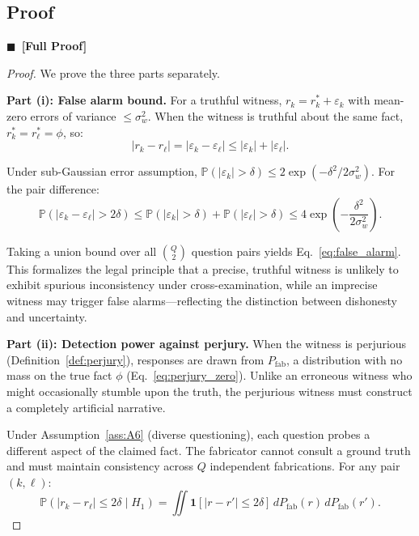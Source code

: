 \documentclass[11pt,a4paper]{article}
\theoremstyle{definition}
\newcommand{\rigorFull}[0]{$\blacksquare$~\textbf{[Full Proof]}}
\newcommand{\Pbb}{\mathbb{P}}
\newcommand{\ind}[1]{\mathbf{1}[#1]}
\newcommand{\abs}[1]{\left|#1\right|}
\newcommand{\fact}{\phi}                        %
\begin{document}
\subsection{Proof} \rigorFull

\begin{proof}
We prove the three parts separately.

\medskip\noindent\textbf{Part (i): False alarm bound.}
For a truthful witness, $r_k = r_k^* + \varepsilon_k$ with mean-zero errors of variance $\leq \sigma_w^2$. When the witness is truthful about the same fact, $r_k^* = r_\ell^* = \fact$, so:
\begin{equation}
    \abs{r_k - r_\ell} = \abs{\varepsilon_k - \varepsilon_\ell} \leq \abs{\varepsilon_k} + \abs{\varepsilon_\ell}.
\end{equation}

Under sub-Gaussian error assumption, $\Pbb(\abs{\varepsilon_k} > \delta) \leq 2\exp(-\delta^2 / 2\sigma_w^2)$. For the pair difference:
\begin{equation}
    \Pbb(\abs{\varepsilon_k - \varepsilon_\ell} > 2\delta) \leq \Pbb(\abs{\varepsilon_k} > \delta) + \Pbb(\abs{\varepsilon_\ell} > \delta) \leq 4\exp\left(-\frac{\delta^2}{2\sigma_w^2}\right).
\end{equation}

Taking a union bound over all $\binom{Q}{2}$ question pairs yields Eq.~\eqref{eq:false_alarm}. This formalizes the legal principle that a precise, truthful witness is unlikely to exhibit spurious inconsistency under cross-examination, while an imprecise witness may trigger false alarms---reflecting the distinction between dishonesty and uncertainty.

\medskip\noindent\textbf{Part (ii): Detection power against perjury.}
When the witness is perjurious (Definition~\ref{def:perjury}), responses are drawn from $P_{\mathrm{fab}}$, a distribution with no mass on the true fact $\fact$ (Eq.~\eqref{eq:perjury_zero}). Unlike an erroneous witness who might occasionally stumble upon the truth, the perjurious witness must construct a completely artificial narrative.

Under Assumption~\ref{ass:A6} (diverse questioning), each question probes a different aspect of the claimed fact. The fabricator cannot consult a ground truth and must maintain consistency across $Q$ independent fabrications. For any pair $(k, \ell)$:
\begin{equation}
    \Pbb(\abs{r_k - r_\ell} \leq 2\delta \mid H_1) = \iint \ind{\abs{r - r'} \leq 2\delta} \, dP_{\mathrm{fab}}(r) \, dP_{\mathrm{fab}}(r').
\end{equation}


\end{proof}
\end{document}
